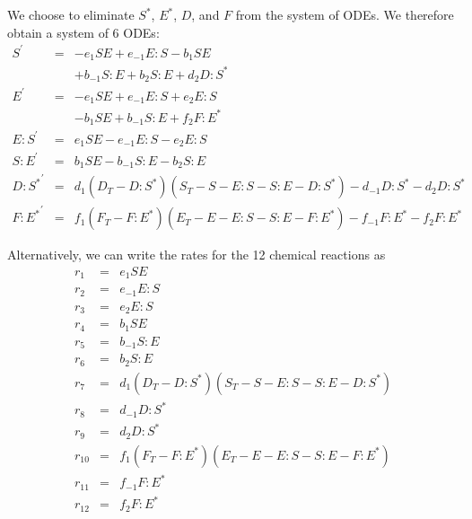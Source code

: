 \documentclass[aip,jcp,preprint]{revtex4-1}
\begin{document}
\begin{widetext}
We choose to eliminate $S^{*}$, $E^{*}$, $D$, and $F$ from the system of ODEs.
%
We therefore obtain a system of 6 ODEs:
\begin{equation}
    \begin{array}{rcl}
        S^\prime & = & -e_1 S E + e_{-1} E:S -b_1 S E \\
                        &   & + b_{-1} S:E + b_2 S:E + d_2 D:S^{*} \\
        E^\prime & = & -e_1 S E + e_{-1} E:S + e_2 E:S \\
                        &   & - b_1 S E +b_{-1} S:E + f_2 F:E^{*} \\
        E:S^\prime  & = & e_1 S E -e_{-1} E:S -e_2 E:S \\
        S:E^\prime & = & b_1 S E -b_{-1} S:E -b_2 S:E \\
        {D:S^{*}}^\prime & = & d_1 (D_T - D:S^{*}) (S_T - S - E:S - S:E - D:S^{*}) - d_{-1} D:S^{*} -d_2 D:S^{*} \\
        {F:E^{*}}^\prime & = & f_1 (F_T - F:E^{*}) (E_T - E - E:S - S:E - F:E^{*}) - f_{-1} F:E^{*} -f_2 F:E^{*}
    \end{array}
\end{equation}
\end{widetext}

Alternatively, we can write the rates for the 12 chemical reactions as
\begin{equation}
    \begin{array}{rcl}
        r_1 & = & e_1 S E \\
        r_2 & = & e_{-1} E:S \\
        r_3 & = & e_2 E:S \\
        r_4 & = & b_1 S E \\
        r_5 & = & b_{-1} S:E \\
        r_6 & = & b_2 S:E \\
        r_7 & = & d_1 (D_T - D:S^{*}) (S_T - S - E:S - S:E - D:S^{*}) \\
        r_8 & = & d_{-1} D:S^{*} \\
        r_9 & = & d_2 D:S^{*} \\
        r_{10} & = & f_1 (F_T - F:E^{*}) (E_T - E - E:S - S:E - F:E^{*}) \\
        r_{11} & = & f_{-1} F:E^{*} \\
        r_{12} & = & f_2 F:E^{*}
    \end{array}
\end{equation}
\end{document}
